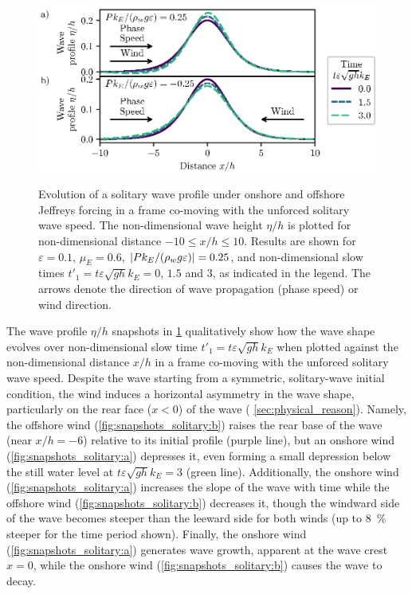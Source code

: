 \documentclass{jfm}
\renewcommand*{\epsilon}{\varepsilon}
\begin{document}
\begin{figure}
  \centering
  { %
    \label{fig:snapshots_solitary:a}
    \label{fig:snapshots_solitary:b}
  }
  \includegraphics{Snapshots-Positive-Negative-Production.eps}
  \caption{
    Evolution of a solitary wave profile under
    onshore and
    offshore Jeffreys forcing in a frame co-moving with the unforced
    solitary wave speed.
    The non-dimensional wave height $\eta/h$ is plotted for
    non-dimensional distance $-10 \le x/h \le 10$.
    Results are shown for $\epsilon=0.1$, $\mu_E = 0.6$, $\abs{P
    k_E/(\rho_w g \epsilon)} = 0.25$, and non-dimensional slow times
    $t'_1 = t \epsilon \sqrt{gh} k_E = 0$, $1.5$ and $3$, as indicated
    in the legend.
    The arrows denote the direction of wave propagation (phase speed) or
    wind direction.
  }\label{fig:snapshots_solitary}
\end{figure}

The wave profile $\eta/h$ snapshots in \cref{fig:snapshots_solitary}
qualitatively show how the wave shape evolves over non-dimensional slow
time $t'_1 = t \epsilon \sqrt{g h} k_E$ when plotted against the
non-dimensional distance $x/h$ in a frame co-moving with the unforced
solitary wave speed.
Despite the wave starting from a symmetric, solitary-wave initial
condition, the wind induces a horizontal asymmetry in the wave shape,
particularly on the rear face ($x<0$) of the wave (\cf{}
\cref{sec:physical_reason}).
Namely, the offshore wind (\cref{fig:snapshots_solitary:b}) raises the
rear base of the wave (near $x/h = -6$) relative to its initial profile
(purple line), but an onshore wind (\cref{fig:snapshots_solitary:a})
depresses it, even forming a small depression below the still water
level at $t\epsilon \sqrt{gh} k_E=3$ (green line).
Additionally, the onshore wind (\cref{fig:snapshots_solitary:a})
increases the slope of the wave with time while the offshore wind
(\cref{fig:snapshots_solitary:b}) decreases it, though the windward side
of the wave becomes steeper than the leeward side for both winds (up to
\SI{8}{\percent} steeper for the time period shown).
Finally, the onshore wind (\cref{fig:snapshots_solitary:a}) generates
wave growth, apparent at the wave crest $x=0$, while the onshore wind
(\cref{fig:snapshots_solitary:b}) causes the wave to decay.
\end{document}
